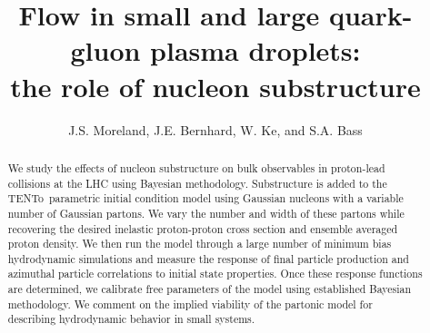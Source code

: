 \documentclass[3p,times,procedia]{elsarticle}
\newcommand{\trento}{T\raisebox{-0.3ex}{R}ENTo}
\begin{document}
\begin{frontmatter}




\title{Flow in small and large quark-gluon plasma droplets:\\the role of nucleon substructure}

\author{J.S. Moreland, J.E. Bernhard, W. Ke, and S.A. Bass}
\address{Department of Physics, Duke University, Durham, NC 27708-0305}

\begin{abstract}
We study the effects of nucleon substructure on bulk observables in proton-lead collisions at the LHC using Bayesian methodology. Substructure is added to the \trento\ parametric initial condition model using Gaussian nucleons with a variable number of Gaussian partons. We vary the number and width of these partons while recovering the desired inelastic proton-proton cross section and ensemble averaged proton density. We then run the model through a large number of minimum bias hydrodynamic simulations and measure the response of final particle production and azimuthal particle correlations to initial state properties. Once these response functions are determined, we calibrate free parameters of the model using established Bayesian methodology. We comment on the implied viability of the partonic model for describing hydrodynamic behavior in small systems.
\end{abstract}


\end{frontmatter}
\end{document}
